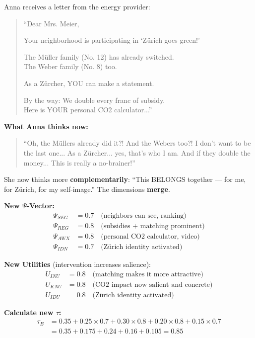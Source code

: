 Anna receives a letter from the energy provider:
\begin{quote}
``Dear Mrs. Meier,

Your neighborhood is participating in `Zürich goes green!'

The Müller family (No. 12) has already switched.\\
The Weber family (No. 8) too.

As a Zürcher, YOU can make a statement.

By the way: We double every franc of subsidy.\\
Here is YOUR personal CO2 calculator...''
\end{quote}

\textbf{What Anna thinks now:}
\begin{quote}
``Oh, the Müllers already did it?! And the Webers too?! I don't want to be the last one... As a Zürcher... yes, that's who I am. And if they double the money... This is really a no-brainer!''
\end{quote}

She now thinks more \textbf{complementarily}: ``This BELONGS together --- for me, for Zürich, for my self-image.'' The dimensions \textbf{merge}.

\textbf{New $\Psi$-Vector:}
\begin{align*}
\Psi_{SEG} &= 0.7 \quad \text{(neighbors can see, ranking)} \\
\Psi_{REG} &= 0.8 \quad \text{(subsidies + matching prominent)} \\
\Psi_{AWX} &= 0.8 \quad \text{(personal CO2 calculator, video)} \\
\Psi_{IDN} &= 0.7 \quad \text{(Zürich identity activated)}
\end{align*}

\textbf{New Utilities} (intervention increases salience):
\begin{align*}
U_{INU} &= 0.8 \quad \text{(matching makes it more attractive)} \\
U_{KNU} &= 0.8 \quad \text{(CO2 impact now salient and concrete)} \\
U_{IDU} &= 0.8 \quad \text{(Zürich identity activated)}
\end{align*}

\textbf{Calculate new $\tau$:}
\begin{align}
\tau_B &= 0.35 + 0.25 \times 0.7 + 0.30 \times 0.8 + 0.20 \times 0.8 + 0.15 \times 0.7 \nonumber \\
&= 0.35 + 0.175 + 0.24 + 0.16 + 0.105 = \mathbf{0.85}
\end{align}

